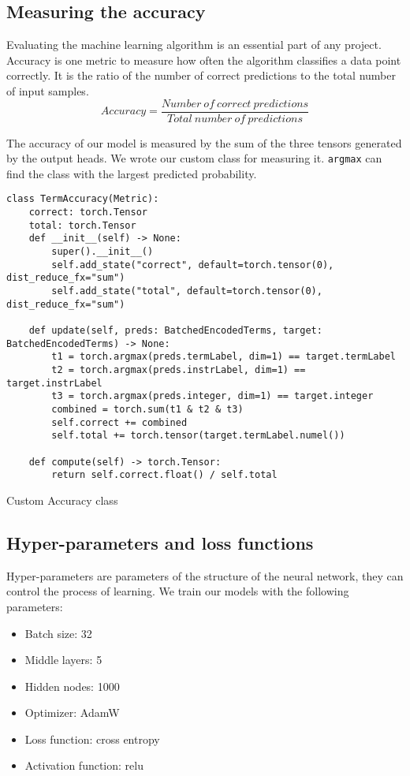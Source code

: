 \subsection{Measuring the accuracy}
\label{sec:termacc}
Evaluating the machine learning algorithm is an essential part of any project. Accuracy is one metric to measure how often the algorithm classifies a data point correctly. It is the ratio of the number of correct predictions to the total number of input samples.
\[Accuracy=\frac{Number\ of\ correct\ predictions}{Total\ number\ of\ predictions}\]

The accuracy of our model is measured by the sum of the three tensors generated by the output heads. We wrote our custom class for measuring it. \texttt{argmax} can find the class with the largest predicted probability.
\begin{listing}[H]
\begin{verbatim}
class TermAccuracy(Metric):
    correct: torch.Tensor
    total: torch.Tensor
    def __init__(self) -> None:
        super().__init__()
        self.add_state("correct", default=torch.tensor(0), dist_reduce_fx="sum")
        self.add_state("total", default=torch.tensor(0), dist_reduce_fx="sum")

    def update(self, preds: BatchedEncodedTerms, target: BatchedEncodedTerms) -> None:
        t1 = torch.argmax(preds.termLabel, dim=1) == target.termLabel
        t2 = torch.argmax(preds.instrLabel, dim=1) == target.instrLabel
        t3 = torch.argmax(preds.integer, dim=1) == target.integer
        combined = torch.sum(t1 & t2 & t3)
        self.correct += combined
        self.total += torch.tensor(target.termLabel.numel())

    def compute(self) -> torch.Tensor:
        return self.correct.float() / self.total
\end{verbatim}
\caption{Custom Accuracy class}
\end{listing}


\subsection{Hyper-parameters and loss functions}
Hyper-parameters are parameters of the structure of the neural network, they can control the process of learning. We train our models with the following parameters:
\begin{itemize}
    \item Batch size: 32
    \item Middle layers: 5
    \item Hidden nodes: 1000
    \item Optimizer: AdamW
    \item Loss function: cross entropy
    \item Activation function: relu
\end{itemize}


